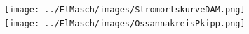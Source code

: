 	\begin{minipage}{7cm}
    	\texttt{[image: ../ElMasch/images/StromortskurveDAM.png]}\\
    	\texttt{[image: ../ElMasch/images/OssannakreisPkipp.png]}
    \end{minipage}

        
		
% 		
% 		


